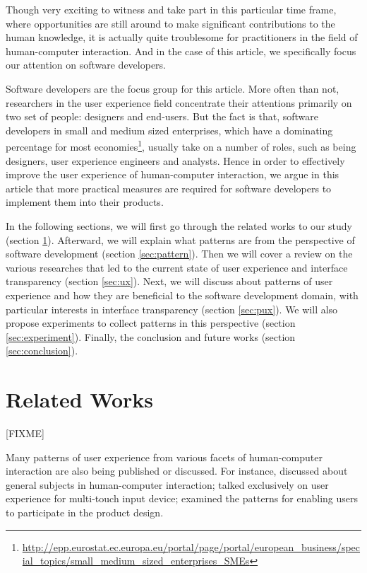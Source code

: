 \documentclass[a4paper,titlepage]{article}
\begin{document}
Though very exciting to witness and take part in this particular time
frame, where opportunities are still around to make significant
contributions to the human knowledge, it is actually quite troublesome
for practitioners in the field of human-computer interaction. And in
the case of this article, we specifically focus our attention on
software developers.

Software developers are the focus group for this article. More often
than not, researchers in the user experience field concentrate their
attentions primarily on two set of people: designers and
end-users. But the fact is that, software developers in small and
medium sized enterprises, which have a dominating percentage for most
economies\footnote{\url{http://epp.eurostat.ec.europa.eu/portal/page/portal/european_business/special_topics/small_medium_sized_enterprises_SMEs}},
usually take on a number of roles, such as being designers, user
experience engineers and analysts. Hence in order to effectively
improve the user experience of human-computer interaction, we argue in
this article that more practical measures are required for software
developers to implement them into their products.

In the following sections, we will first go through the related works
to our study (section \ref{sec:related}). Afterward, we will explain
what patterns are from the perspective of software development
(section \ref{sec:pattern}). Then we will cover a review on the
various researches that led to the current state of user experience
and interface transparency (section \ref{sec:ux}). Next, we will
discuss about patterns of user experience and how they are beneficial
to the software development domain, with particular interests in
interface transparency (section \ref{sec:pux}). We will also propose
experiments to collect patterns in this perspective (section
\ref{sec:experiment}). Finally, the conclusion and future works
(section \ref{sec:conclusion}).


\section{Related Works}
\label{sec:related}
[FIXME]

Many patterns of user experience from various facets of human-computer
interaction are also being published or discussed.  For instance,
\citet{patterns:tidwell} discussed about general subjects in
human-computer interaction; \citet{touch:boudreaux} talked exclusively
on user experience for multi-touch input device;
\citet{participatory:dearden} examined the patterns for enabling users
to participate in the product design.
\end{document}
